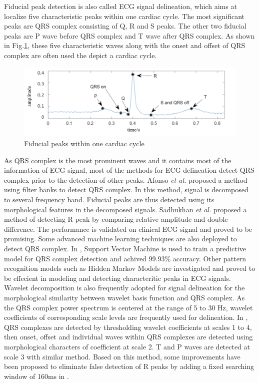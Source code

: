 Fiducial peak detection is also called ECG signal delineation, which aims at localize five characteristic peaks within one cardiac cycle. The most significant peaks are QRS complex consisting of Q, R and S peaks. The other two fiducial peaks are P wave before QRS complex and T wave after QRS complex. As shown in Fig.\ref{fig:fiducial_peaks}, these five characteristic waves along with the onset and offset of QRS complex are often used the depict a cardiac cycle.

 \begin{figure}[thpb]
 	\centering
 	\includegraphics[scale=0.7]{Fig/fiducial_peaks.png}  
 	\caption{Fiducial peaks within one cardiac cycle}
 	\label{fig:fiducial_peaks}
 \end{figure}
 
As QRS complex is the most prominent waves and it contains most of the information of ECG signal, most of the methods for ECG delineation detect QRS complex prior to the detection of other peaks. Afonso \textit{et al.} \cite{afonso1999ecg} proposed a method using filter banks to detect QRS complex. In this method, signal is decomposed to several frequency band. Fiducial peaks are thus detected using its morphological features in the decomposed signals. Sadhukhan \textit{et al.} \cite{sadhukhan2012r} proposed a method of detecting R peak by comparing relative amplitude and double difference. The performance is validated on clinical ECG signal and proved to be promising. Some advanced machine learning techniques are also deployed to detect QRS complex. In \cite{mehta2008svm}, Support Vector Machine is used to train a predictive model for QRS complex detection and achived 99.93\% accuracy. Other pattern recognition models such as Hidden Markov Models are investigated and proved to be effecient in modeling and detecting characteritic peaks in ECG signals\cite{andreao2006ecg}. Wavelet decomposition is also frequently adopted for signal delineation for the morphological similarity between wavelet basis function and QRS complex. As the QRS complex power spectrum is centered at the range of 5 to 30 Hz, wavelet coefficients of corresponding scale levels are frequently used for delineation. In \cite{martinez2004wavelet}, QRS complexes are detected by thresholding wavelet coefficients at scales 1 to 4, then onset, offset and individual waves within QRS complexes are detected using morphological characters of coefficient at scale 2. T and P waves are detected at scale 3 with similar method. Based on this method, some improvements have been proposed to eliminate false detection of R peaks by adding a fixed searching window of 160ms in \cite{banerjee2012delineation}. 

